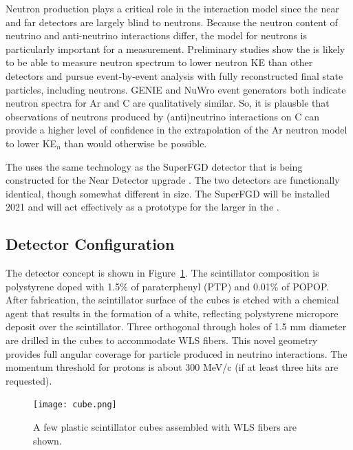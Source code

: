 Neutron production plays a critical role in the interaction model since the near and far  detectors are largely blind to neutrons. Because the neutron content of neutrino and anti-neutrino interactions differ, the model for neutrons is particularly important for a  measurement.  Preliminary studies show the  is likely to be able to measure neutron spectrum to lower neutron KE than other detectors and pursue event-by-event analysis with fully reconstructed final state particles, including neutrons.  GENIE and NuWro event generators both indicate neutron spectra for Ar and C are qualitatively similar.  So, it is plausble that observations of neutrons produced by (anti)neutrino interactions on C can provide a higher level of confidence in the extrapolation of the Ar neutron model to lower KE$_{n}$ than would otherwise be possible.

The  uses the same technology as the SuperFGD detector that is being constructed for the  Near Detector upgrade \cite{Abe:2019whr}.  The two detectors are functionally identical, though somewhat different in size.  The SuperFGD will be installed 2021 and will act effectively as a prototype for the larger  in the   . 


\subsection{Detector Configuration}

The  detector concept is shown in Figure~\ref{fig:cube}.
The scintillator composition is polystyrene doped with 1.5\% of paraterphenyl (PTP) and 0.01\% of POPOP. After fabrication, the scintillator surface of the cubes is etched with a chemical agent that results in the formation of a white, reflecting polystyrene micropore deposit over the scintillator. Three orthogonal through holes of 1.5 mm diameter are drilled in the cubes to accommodate WLS fibers. 
This novel geometry provides full angular coverage for particle produced in neutrino interactions.  The momentum threshold for protons is about 300 MeV/c (if at least three hits are requested).


\begin{figure}
\begin{center}
  \texttt{[image: cube.png]}
\caption{\label{fig:cube}
A few plastic scintillator cubes assembled with WLS fibers are shown.}
\end{center}
\end{figure}

